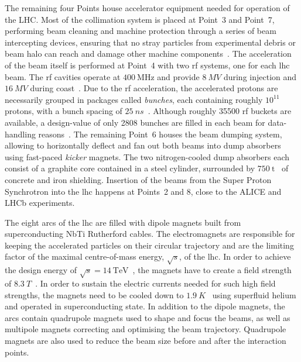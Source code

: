 The remaining four Points house accelerator equipment needed for operation of the LHC. Most of the collimation system is placed at Point~3 and Point~7, performing beam cleaning and machine protection through a series of beam intercepting devices, ensuring that no stray particles from experimental debris or beam halo can reach and damage other machine components~\cite{Bruning:782076}. The acceleration of the beam itself is performed at Point~4 with two \gls{rf} systems, one for each \gls{lhc} beam. The \gls{rf} cavities operate at $\SI{400}{\MHz}$ and provide $\SI{8}{MV}$ during injection and $\SI{16}{MV}$ during coast~\cite{Bruning:782076}. Due to the \gls{rf} acceleration, the accelerated protons are necessarily grouped in packages called \textit{bunches}, each containing roughly $10^{11}$ protons, with a bunch spacing of $\SI{25}{ns}$~\cite{Bruning:782076}. Although roughly \num[group-separator={,}]{35500} \gls{rf} buckets are available, a design-value of only 2808 bunches are filled in each beam for data-handling reasons~\cite{Bruning:782076}. The remaining Point~6 houses the beam dumping system, allowing to horizontally deflect and fan out both beams into dump absorbers using fast-paced \textit{kicker} magnets. The two nitrogen-cooled dump absorbers each consist of a graphite core contained in a steel cylinder, surrounded by $\SI{750}{\tonne}$~\cite{Bruning:782076} of concrete and iron shielding. Insertion of the beams from the Super Proton Synchrotron into the \gls{lhc} happens at Points~2 and 8, close to the ALICE and LHCb experiments.

The eight arcs of the \gls{lhc} are filled with dipole magnets built from superconducting NbTi Rutherford cables. The electromagnets are responsible for keeping the accelerated particles on their circular trajectory and are the limiting factor of the maximal centre-of-mass energy, $\sqrt{s}$, of the \gls{lhc}. In order to achieve the design energy of $\sqrt{s} = \SI{14}{\TeV}$~\cite{Bruning:782076}, the magnets have to create a field strength of $\SI{8.3}{T}$~\cite{Bruning:782076}. In order to sustain the electric currents needed for such high field strengths, the magnets need to be cooled down to $\SI{1.9}{K}$~\cite{Bruning:782076} using superfluid helium and operated in superconducting state. In addition to the dipole magnets, the arcs contain quadrupole magnets used to shape and focus the beams, as well as multipole magnets correcting and optimising the beam trajectory. Quadrupole magnets are also used to reduce the beam size before and after the interaction points.

